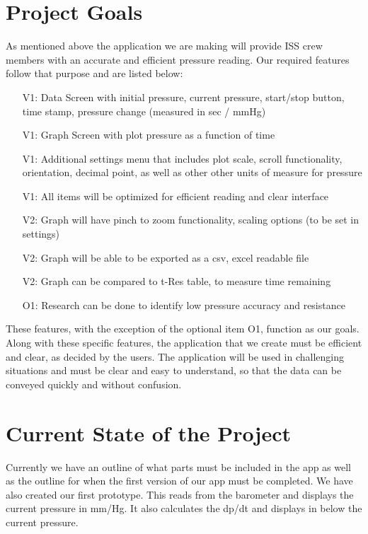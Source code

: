 \documentclass[onecolumn, draftclsnofoot,10pt, compsoc]{IEEEtran}
\begin{document}
\section{Project Goals}
As mentioned above the application we are making will provide ISS crew members with an accurate and efficient pressure reading.
Our required features follow that purpose and are listed below:
\begin{itemize}
\item[V1:] Data Screen with initial pressure, current pressure, start/stop button, time stamp, pressure change (measured in sec / mmHg)
\item[V1:] Graph Screen with plot pressure as a function of time
\item[V1:] Additional settings menu that includes plot scale, scroll functionality, orientation, decimal point, as well as other other units of measure for pressure
\item[V1:] All items will be optimized for efficient reading and clear interface
\item[V2:] Graph will have pinch to zoom functionality, scaling options (to be set in settings)
\item[V2:] Graph will be able to be exported as a csv, excel readable file
\item[V2:] Graph can be compared to t-Res table, to measure time remaining
\item[O1:] Research can be done to identify low pressure accuracy and resistance
\end{itemize}
These features, with the exception of the optional item O1, function as our goals.
Along with these specific features, the application that we create must be efficient and clear, as decided by the users.
The application will be used in challenging situations and must be clear and easy to understand, so that the data can be conveyed quickly and without confusion.

\section{Current State of the Project}
Currently we have an outline of what parts must be included in the app as well as the outline for when the first version of our app must be completed. We have also created our first prototype. This reads from the barometer and displays the current pressure in mm/Hg. It also calculates the dp/dt and displays in below the current pressure.
\end{document}
